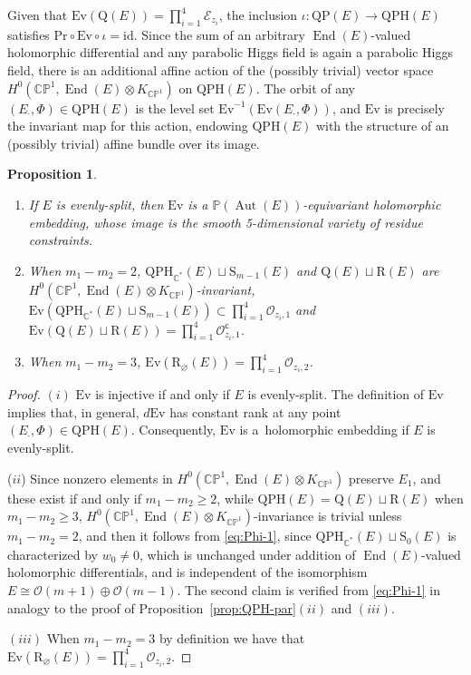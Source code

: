 \documentclass[10pt,a4paper]{amsart}
\newcommand{\field}[1]{\ensuremath{\mathbb{#1}}}
\newcommand{\CC}{\field{C}}
\newcommand{\PP}{\field{P}}
\newcommand{\calO}{\mathcal{O}}
\newcommand{\curly}[1]{\mathscr{#1}}
\newcommand{\cE}{\curly{E}}
\newcommand{\cO}{\curly{O}}
\newcommand{\qp}{\boldsymbol{\cdot}}
\DeclareMathOperator{\Aut}{Aut}
\DeclareMathOperator{\End}{End}
\numberwithin{equation}{section}
\newtheorem{Proposition}[Theorem]{Proposition}
 { \theoremstyle{definition}
\newtheorem{Definition}[Theorem]{Definition}
\newtheorem{Note}[Theorem]{Note}
\newtheorem{Example}[Theorem]{Example}
\newtheorem{Remark}[Theorem]{Remark} }
\begin{document}
Given that $\mathrm{Ev}(\mathrm{Q}(E))= \prod_{i=1}^{4}\cE_{z_{i}}$, the inclusion $\iota\colon \mathrm{QP}(E)\rightarrow \mathrm{QPH}(E)$ satisfies $\mathrm{Pr}\circ \mathrm{Ev}\circ\iota = \mathrm{id}$. Since the sum of an arbitrary $\End (E)$-valued holomorphic differential and any parabolic Higgs field is again a parabolic Higgs field, there is an additional affine action of the (possibly trivial) vector space $H^{0}(\CC\PP^{1},\End(E)\otimes K_{\CC\PP^{1}})$ on $\mathrm{QPH}(E)$. The orbit of any $(E_{\qp},\Phi)\in\mathrm{QPH}(E)$ is the level set $\mathrm{Ev}^{-1}(\mathrm{Ev}(E_{\qp},\Phi))$, and $\mathrm{Ev}$ is precisely the invariant map for this action, endowing $\mathrm{QPH}(E)$ with the structure of an (possibly trivial) affine bundle over its image.


\begin{Proposition}\label{prop:Ev}\quad
\begin{enumerate}\itemsep=0pt
\item[$(i)$] If $E$ is evenly-split, then $\mathrm{Ev}$ is a $\PP(\Aut (E))$-equivariant holomorphic embedding, whose image is the smooth 5-dimensional variety of residue constraints.
\item[$(ii)$] When $m_{1}-m_{2} = 2$, $\mathrm{QPH}_{\CC^{*}}(E)\sqcup\mathrm{S}_{m-1}(E)$ and $\mathrm{Q}(E)\sqcup\mathrm{R}(E)$ are $H^{0}(\CC\PP^{1},\End(E)\otimes K_{\CC\PP^{1}})$-invariant, $\mathrm{Ev}(\mathrm{QPH}_{\CC^{*}}(E)\sqcup\mathrm{S}_{m-1}(E))\subset \prod_{i=1}^{4}\cO_{z_{i},1}$ and $\mathrm{Ev}(\mathrm{Q}(E)\sqcup\mathrm{R}(E)) = \prod_{i=1}^{4}\cO^{\mathsf{c}}_{z_{i},1}$.
\item[$(iii)$] When $m_{1}-m_{2} = 3$, $\mathrm{Ev}(\mathrm{R}_{\varnothing }(E)) = \prod_{i=1}^{4}\cO_{z_{i},2}$.
\end{enumerate}
\end{Proposition}

\begin{proof}
$(i)$ $\mathrm{Ev}$ is injective if and only if $E$ is evenly-split. The definition of $\mathrm{Ev}$ implies that, in general, $d\mathrm{Ev}$ has constant rank at any point $(E_{\qp},\Phi)\in\mathrm{QPH}(E)$. Consequently, $\mathrm{Ev}$ is a~holomorphic embedding if $E$ is evenly-split.

($ii$) Since nonzero elements in $H^{0}(\CC\PP^{1},\End(E)\otimes K_{\CC\PP^{1}})$ preserve $E_{1}$, and these exist if and only if $m_{1}-m_{2}\geq 2$, while $\mathrm{QPH}(E) = \mathrm{Q}(E)\sqcup\mathrm{R}(E)$ when $m_{1}-m_{2}\geq 3$, $H^{0}(\CC\PP^{1},\End(E)\otimes K_{\CC\PP^{1}})$-invariance is trivial unless $m_{1}-m_{2}=2$, and then it follows from \eqref{eq:Phi-1}, since $\mathrm{QPH}_{\CC^{*}}(E)\sqcup \mathrm{S}_{0}(E)$ is characterized by $w_{0}\neq 0$, which is unchanged under addition of $\End(E)$-valued holomorphic differentials, and is independent of the isomorphism $E\cong\calO(m+1)\oplus\calO(m-1)$. The second claim is verified from \eqref{eq:Phi-1} in analogy to the proof of Proposition~\ref{prop:QPH-par}$(ii)$ and $(iii)$.

$(iii)$ When $m_{1}-m_{2}=3$ by definition we have that $\mathrm{Ev}(\mathrm{R}_{\varnothing }(E)) = \prod_{i=1}^{4}\cO_{z_{i},2}$.
\end{proof}
\end{document}
